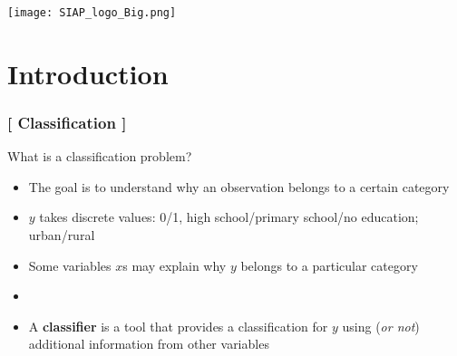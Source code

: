 \documentclass[xcolor=x11names,compress, handhouts]{beamer}
\renewcommand{\(}{\begin{columns}}
\renewcommand{\)}{\end{columns}}
\newcommand{\<}[1]{\begin{column}{#1}}
\renewcommand{\>}{\end{column}}
\begin{document}
\begin{frame}
\Large{ \color{siap}{Machine Learning for Official Statistics and SDGs}}

\hspace{1cm}


\hspace{2cm}
\begin{center}

\texttt{[image: SIAP\_logo\_Big.png]}

\end{center}
\end{frame}



\section{Introduction}

\begin{frame} %

\frametitle{\textcolor{brique}{[ Classification ]}}
What is a classification problem?
\pause
\begin{itemize}[<+->]
  \item The goal  is to understand why an observation belongs to a certain category
  \item  $y$  takes discrete values:  0/1, high school/primary school/no education; urban/rural
  \item Some variables $x$s may explain why $y$ belongs to a particular category
  \item[]
  \item[] \begin{center}A \textbf{classifier} is a tool that provides a classification for $y$ using (\textit{or not}) additional information from other variables \end{center}
\end{itemize}
\end{frame}
\end{document}
